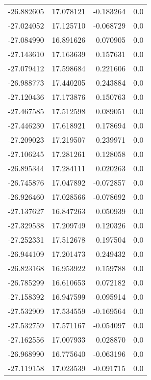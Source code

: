 \begin{tabular}{rrrr}
      -26.882605 &        17.078121 &   -0.183264 &   0.0 \\
      -27.024052 &        17.125710 &   -0.068729 &   0.0 \\
      -27.084990 &        16.891626 &    0.070905 &   0.0 \\
      -27.143610 &        17.163639 &    0.157631 &   0.0 \\
      -27.079412 &        17.598684 &    0.221606 &   0.0 \\
      -26.988773 &        17.440205 &    0.243884 &   0.0 \\
      -27.120436 &        17.173876 &    0.150763 &   0.0 \\
      -27.467585 &        17.512598 &    0.089051 &   0.0 \\
      -27.446230 &        17.618921 &    0.178694 &   0.0 \\
      -27.209023 &        17.219507 &    0.239971 &   0.0 \\
      -27.106245 &        17.281261 &    0.128058 &   0.0 \\
      -26.895344 &        17.284111 &    0.020263 &   0.0 \\
      -26.745876 &        17.047892 &   -0.072857 &   0.0 \\
      -26.926460 &        17.028566 &   -0.078692 &   0.0 \\
      -27.137627 &        16.847263 &    0.050939 &   0.0 \\
      -27.329538 &        17.209749 &    0.120326 &   0.0 \\
      -27.252331 &        17.512678 &    0.197504 &   0.0 \\
      -26.944109 &        17.201473 &    0.249432 &   0.0 \\
      -26.823168 &        16.953922 &    0.159788 &   0.0 \\
      -26.785299 &        16.610653 &    0.072182 &   0.0 \\
      -27.158392 &        16.947599 &   -0.095914 &   0.0 \\
      -27.532909 &        17.534559 &   -0.169564 &   0.0 \\
      -27.532759 &        17.571167 &   -0.054097 &   0.0 \\
      -27.162556 &        17.007933 &    0.028870 &   0.0 \\
      -26.968990 &        16.775640 &   -0.063196 &   0.0 \\
      -27.119158 &        17.023539 &   -0.091715 &   0.0 \\

\end{tabular}
